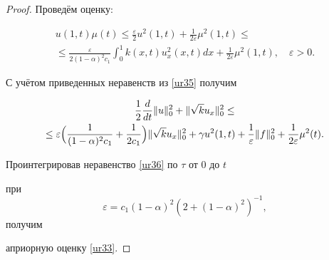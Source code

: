 \begin{proof}
Проведём оценку:

\begin{multline*}

u(1,t)\mu(t)\leq\frac{\varepsilon}{2}u^2(1,t)+\frac{1}{2\varepsilon}\mu^2(1,t)\leq

\\

\leq\frac{\varepsilon

}{2(1-\alpha)^2c_1}\int_{0}^{1}k(x,t)u_x^2(x,t)dx+\frac{1}{2\varepsilon}\mu^2(1,t),

\quad \varepsilon>0.

\end{multline*}



С учётом приведенных неравенств из \eqref{ur35} получим

\begin{multline}

\frac{1}{2}\frac{d}{dt}\|u\|_0^2+\|\sqrt{k}u_x\|_0^2\leq

\\

\leq\varepsilon

\Bigl(\frac{1}{(1-\alpha)^2c_1}+\frac{1}{2c_1}\Bigr)\|\sqrt{k}u_x\|_0^2+\gamma

u^2(1,t)+\frac{1}{\varepsilon}\|f\|_0^2+\frac{1}{2\varepsilon}\mu^2(t).

 \label{ur36}

\end{multline}



Проинтегрировав неравенство \eqref{ur36} по $\tau$ от $0$ до $t$

при $$\varepsilon=c_1(1-\alpha)^2(2+(1-\alpha)^2)^{-1},$$ получим

априорную оценку \eqref{ur33}.

\end{proof}



\smallskip



